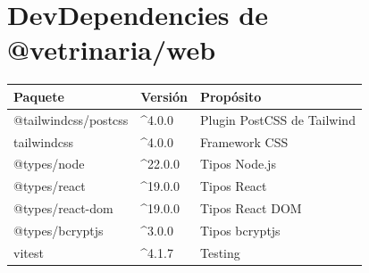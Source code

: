 \section{DevDependencies de @vetrinaria/web}

\begin{longtable}{|l|l|l|}
\hline
\textbf{Paquete} & \textbf{Versi\'on} & \textbf{Prop\'osito} \\
\hline
@tailwindcss/postcss & \textasciicircum4.0.0 & Plugin PostCSS de Tailwind \\
tailwindcss & \textasciicircum4.0.0 & Framework CSS \\
@types/node & \textasciicircum22.0.0 & Tipos Node.js \\
@types/react & \textasciicircum19.0.0 & Tipos React \\
@types/react-dom & \textasciicircum19.0.0 & Tipos React DOM \\
@types/bcryptjs & \textasciicircum3.0.0 & Tipos bcryptjs \\
vitest & \textasciicircum4.1.7 & Testing \\
\hline
\end{longtable}
